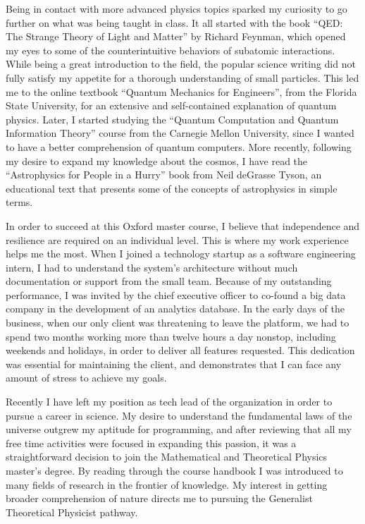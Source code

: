 \documentclass[11pt]{article}
\newcommand*{\NEWLINE}{\vspace{0.75em}}
\begin{document}
Being in contact with more advanced physics topics sparked my curiosity to go further on what was being taught in class. It all started with the book ``QED: The Strange Theory of Light and Matter'' by Richard Feynman, which opened my eyes to some of the counterintuitive behaviors of subatomic interactions. While being a great introduction to the field, the popular science writing did not fully satisfy my appetite for a thorough understanding of small particles. This led me to the online textbook ``Quantum Mechanics for Engineers'', from the Florida State University, for an extensive and self-contained explanation of quantum physics. Later, I started studying the ``Quantum Computation and Quantum Information Theory'' course from the Carnegie Mellon University, since I wanted to have a better comprehension of quantum computers. More recently, following my desire to expand my knowledge about the cosmos, I have read the ``Astrophysics for People in a Hurry'' book from Neil deGrasse Tyson, an educational text that presents some of the concepts of astrophysics in simple terms.
\NEWLINE{}

In order to succeed at this Oxford master course, I believe that independence and resilience are required on an individual level. This is where my work experience helps me the most. When I joined a technology startup as a software engineering intern, I had to understand the system's architecture without much documentation or support from the small team. Because of my outstanding performance, I was invited by the chief executive officer to co-found a big data company in the development of an analytics database. In the early days of the business, when our only client was threatening to leave the platform, we had to spend two months working more than twelve hours a day nonstop, including weekends and holidays, in order to deliver all features requested. This dedication was essential for maintaining the client, and demonstrates that I can face any amount of stress to achieve my goals. \NEWLINE{}

Recently I have left my position as tech lead of the organization in order to pursue a career in science. My desire to understand the fundamental laws of the universe outgrew my aptitude for programming, and after reviewing that all my free time activities were focused in expanding this passion, it was a straightforward decision to join the Mathematical and Theoretical Physics master's degree. By reading through the course handbook I was introduced to many fields of research in the frontier of knowledge. My interest in getting broader comprehension of nature directs me to pursuing the Generalist Theoretical Physicist pathway.
\end{document}

